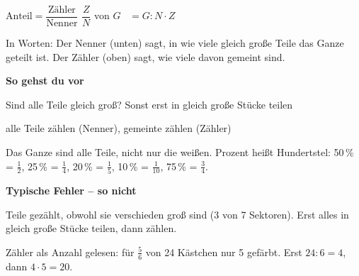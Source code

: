 \documentclass[11pt]{article}
\newcommand{\nr}[1]{\makebox[7mm][l]{\textbf{#1}}}
\begin{document}
\begin{tcolorbox}[colback=mbkasten,colframe=mbgrau,boxrule=0.5pt,arc=1mm,left=3mm,right=3mm,top=2mm,bottom=2mm,title={\bfseries Formel auf einen Blick},coltitle=black,colbacktitle=black!10]
\begin{minipage}[t]{0.58\linewidth}\vspace{0pt}
{\Large $\text{Anteil} = \dfrac{\text{Zähler}}{\text{Nenner}}$ \qquad $\dfrac{Z}{N}$ von $G$ \ $= G : N \cdot Z$}\par\medskip
In Worten: Der Nenner (unten) sagt, in wie viele gleich große Teile das Ganze geteilt ist. Der Zähler (oben) sagt, wie viele davon gemeint sind.\par\medskip
\textbf{So gehst du vor}\par
\nr{1}Sind alle Teile gleich groß? Sonst erst in gleich große Stücke teilen\par
\nr{2}alle Teile zählen (Nenner), gemeinte zählen (Zähler)\par
\medskip
{\small Das Ganze sind alle Teile, nicht nur die weißen. Prozent heißt Hundertstel: 50\,\% = $\frac{1}{2}$, 25\,\% = $\frac{1}{4}$, 20\,\% = $\frac{1}{5}$, 10\,\% = $\frac{1}{10}$, 75\,\% = $\frac{3}{4}$.}
\end{minipage}\hfill
\begin{minipage}[t]{0.38\linewidth}\vspace{2mm}\centering
{}
\end{minipage}
\end{tcolorbox}
\medskip\noindent\textbf{Typische Fehler – so nicht}\par\smallskip
\noindent\nr{$\times$}Teile gezählt, obwohl sie verschieden groß sind (3 von 7 Sektoren). Erst alles in gleich große Stücke teilen, dann zählen.\par
\noindent\nr{$\times$}Zähler als Anzahl gelesen: für $\frac{5}{6}$ von 24 Kästchen nur 5 gefärbt. Erst $24 : 6 = 4$, dann $4 \cdot 5 = 20$.\par
\end{document}
